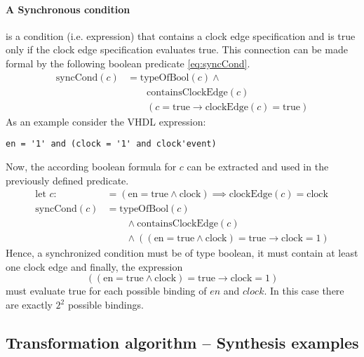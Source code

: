\paragraph{A Synchronous condition} is a condition (i.e. expression)
that contains a clock edge specification and is true only if the clock
edge specification evaluates true. This connection can be made formal
by the following boolean predicate \ref{eq:syncCond}.
%
\begin{equation}\label{eq:syncCond}
    \begin{aligned}
        \text{syncCond}(c) & = \text{typeOfBool}(c) \land \\
        &\qquad \text{containsClockEdge}(c) \\
        &\qquad (c = \text{true} \to \text{clockEdge}(c) = \text{true})
    \end{aligned}
\end{equation}
%
As an example consider the VHDL expression:
%
\begin{lstlisting}[style=vhdl]
en = '1' and (clock = '1' and clock'event)
\end{lstlisting}
%
Now, the according boolean formula for \(c\) can be extracted and used
in the previously defined predicate.
%
\begin{equation}
    \begin{aligned}
        \text{let } c :&= (\text{en} = \text{true} \land \text{clock})
        \implies \text{clockEdge}(c) = \text{clock} \\
        \text{syncCond}(c) &= \text{typeOfBool}(c) \\
        &\qquad \land \text{containsClockEdge}(c) \\
        &\qquad \land ((\text{en} = \text{true} \land \text{clock}) =
        \text{true} \to \text{clock} = 1)
    \end{aligned}
\end{equation}
%
Hence, a synchronized condition must be of type boolean, it must contain
at least one clock edge and finally, the expression
\[
    ((\text{en} = \text{true} \land \text{clock}) = \text{true} \to
    \text{clock} = 1)
\]
%
must evaluate true for each possible binding of \(en\) and
\(clock\). In this case there are exactly \(2^2\) possible bindings.

\subsection{Transformation algorithm -- Synthesis examples}
\label{sec:SynthExamples}

